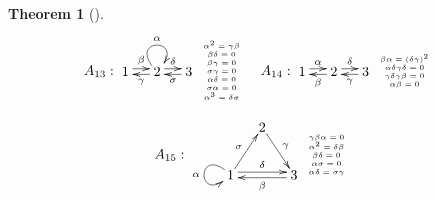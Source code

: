 \documentclass[12pt]{amsart}
\newtheorem{thm}{Theorem}[section]
\numberwithin{equation}{thm}
\begin{document}
{\begin{thm}[{\cite[Theorem, Theorem]{S}}]
\[\begin{array}{c}
\begin{array}{lll}
A_{13}:
\begin{xy}
(0,0) *[o]+{1}="A", (8,0) *[o]+{2}="B", (16,0) *[o]+{3}="C",
\ar @(ul,ur) "B";"B"^{\alpha}
\ar @<2pt> "A";"B"^{\beta}
\ar @<2pt> "B";"A"^{\gamma}
\ar @<2pt> "B";"C"^{\delta }
\ar @<2pt> "C";"B"^{\sigma}
\end{xy}
{\tiny \begin{array}{c}
\alpha^2=\gamma\beta\\
\beta\delta=0\\
 \beta\gamma=0 \\
 \sigma\gamma=0 \\
 \alpha\delta=0 \\
 \sigma\alpha=0 \\
 \alpha^3=\delta\sigma \\
\end{array}
}

&
A_{14}:
\begin{xy}
(0,0) *[o]+{1}="A", (8,0) *[o]+{2}="B", (16,0) *[o]+{3}="C",
\ar @<2pt> "A";"B"^{\alpha}
\ar @<2pt> "B";"A"^{\beta}
\ar @<2pt> "B";"C"^{\delta }
\ar @<2pt> "C";"B"^{\gamma}
\end{xy}
{\tiny \begin{array}{c}
\beta\alpha=(\delta\gamma)^2 \\
\alpha\delta\gamma\delta=0 \\
  \gamma\delta\gamma\beta=0 \\
 \alpha\beta=0 \\
 \end{array}
}

\end{array}\\\\

A_{15}:
\begin{xy}
(0,-5) *[o]+{1}="A",(8,7) *[o]+{2}="B", (16,-5) *[o]+{3}="C", 
\ar @(lu,ld) "A";"A"_{\alpha} 
\ar "A";"B"^{\sigma}
\ar "B";"C"^{\gamma}
\ar @<2pt>"C";"A"^{\beta}
\ar @<2pt>"A";"C"^{\delta}
\end{xy}
{\tiny \begin{array}{c}
\gamma\beta\alpha=0 \\
\alpha^2=\delta\beta \\
\beta\delta=0 \\
\alpha\sigma=0\\
\alpha\delta=\sigma\gamma\\
\end{array}
} 
\hspace{10pt}


\end{array}\]
\end{thm}}
\end{document}
